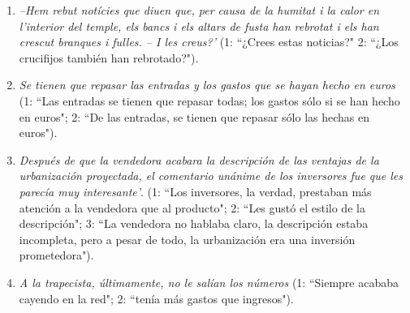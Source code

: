 \begin{enumerate}
\begin{enumerate}
\item \emph{--Hem rebut notícies que diuen que, per causa de la humitat i la calor en l'interior del temple, els bancs i els altars de fusta han rebrotat i els han crescut branques i fulles. -- I les creus?'} (1: ``¿Crees estas noticias?" 2: ``¿Los crucifijos también han rebrotado?"). \item \emph{Se tienen que repasar las entradas y los gastos que se hayan hecho en euros} (1: ``Las entradas se tienen que repasar todas; los gastos sólo si se han hecho en euros"; 2: ``De las entradas, se tienen que repasar sólo las hechas en euros"). \item \emph{Después de que la vendedora acabara la descripción de las ventajas de la urbanización proyectada, el comentario unánime de los inversores fue que les parecía muy interesante'}. (1: ``Los inversores, la verdad, prestaban más atención a la vendedora que al producto"; 2: ``Les gustó el estilo de la descripción"; 3: ``La vendedora no hablaba claro, la descripción estaba incompleta, pero a pesar de todo, la urbanización era una inversión prometedora"). 

\item \emph{A la trapecista, últimamente, no le salían los números} (1: ``Siempre acababa cayendo en la red"; 2: ``tenía más gastos que ingresos"). 


\end{enumerate}
\end{enumerate}
